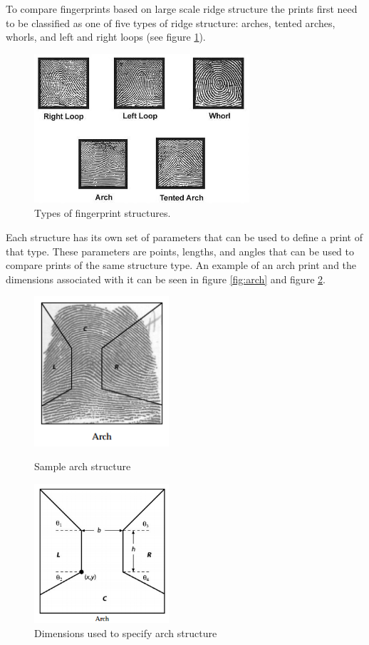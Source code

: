 \documentclass[a4paper]{article}
\begin{document}
To compare fingerprints based on large scale ridge structure the prints first need to be classified as one of five types of ridge structure: arches, tented arches, whorls, and left and right loops (see figure \ref{fig:structures}).
\begin{figure}
\centering
\includegraphics[width=8cm]{Structure_Types.PNG}
\caption{Types of fingerprint structures.}
\label{fig:structures}
\end{figure}
Each structure has its own set of parameters that can be used to define a print of that type. These parameters are points, lengths, and angles that can be used to compare prints of the same structure type. \cite[219-221]{umap} An example of an arch print and the dimensions associated with it can be seen in figure \ref{fig:arch} and figure \ref{fig:archdim}.
\begin{figure}
\centering
\begin{minipage}[b]{0.4\textwidth}
    \includegraphics[width=5cm]{Arch.PNG}
    \caption{Sample arch structure}
    \label{fig:arch}
  \end{minipage}
  \hfill
  \begin{minipage}[b]{0.4\textwidth}
    \includegraphics[width=5cm]{Arch_Dimensions.PNG}
    \caption{Dimensions used to specify arch structure}
    \label{fig:archdim}
  \end{minipage}
\end{figure}
\end{document}
